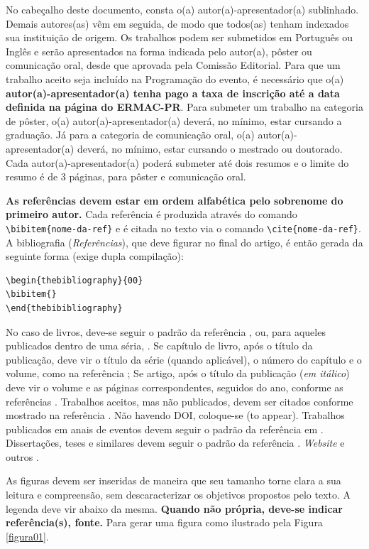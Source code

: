 \documentclass[a4paper, 11pt]{article}
\begin{document}
 No cabeçalho deste documento, consta o(a) autor(a)-apresentador(a) sublinhado. Demais autores(as) vêm em seguida, de modo que todos(as) tenham indexados sua instituição de origem.
Os trabalhos podem ser submetidos em Português ou Inglês e serão apresentados na forma indicada pelo autor(a), pôster ou comunicação oral, desde que aprovada pela Comissão Editorial. Para que um trabalho aceito seja incluído na Programação do evento, é necessário que o(a) {\bf autor(a)-apresentador(a) tenha pago a taxa de inscrição até a data definida na página do ERMAC-PR}. Para submeter um trabalho na categoria de pôster, o(a) autor(a)-apresentador(a) deverá, no mínimo, estar cursando a graduação. Já para a categoria de comunicação oral, o(a) autor(a)-apresentador(a) deverá, no mínimo, estar cursando o mestrado ou doutorado. Cada autor(a)-apresentador(a) poderá submeter até dois resumos e o limite do resumo é de 3 páginas, para pôster e comunicação oral.  

{\bf As referências devem estar em ordem alfabética pelo sobrenome do primeiro autor.} Cada referência é produzida através do comando  \verb!\bibitem{nome-da-ref}! e é citada no texto via o comando \verb!\cite{nome-da-ref}!. A bibliografia ({\it Referências}), que deve figurar no final do artigo, é então gerada da seguinte forma (exige dupla compilação):

\begin{verbatim}
\begin{thebibliography}{00}
\bibitem{}
\end{thebibibliography}
\end{verbatim}

No caso de livros, deve-se seguir o padrão da referência \cite{Boldrini}, ou, para aqueles publicados dentro de uma séria, \cite{Gomes}. Se capítulo de livro, após o título da publicação, deve vir o título da série (quando aplicável), o número do capítulo e o volume, como na referência \cite{daSilva}; Se artigo, após o título da publicação ({\it em itálico}) deve vir o volume e as páginas correspondentes, seguidos do ano, conforme as referências \cite{Diniz2}. Trabalhos aceitos, mas não publicados, devem ser citados conforme mostrado na referência \cite{Cuminato}. Não havendo DOI, coloque-se (to appear). Trabalhos publicados em anais de eventos devem seguir o padrão da referência em \cite{Santos}. Dissertações, teses e similares devem seguir o padrão da referência \cite{Diniz1}. {\it Website} e outros \cite{SBMAC}.



As figuras devem ser inseridas de maneira que seu tamanho torne clara a sua leitura e compreensão, sem descaracterizar os objetivos propostos pelo texto. A legenda deve vir abaixo da mesma. \textbf{Quando não própria, deve-se indicar referência(s), fonte.} Para gerar uma figura como ilustrado pela Figura \ref{figura01}. 
\end{document}
